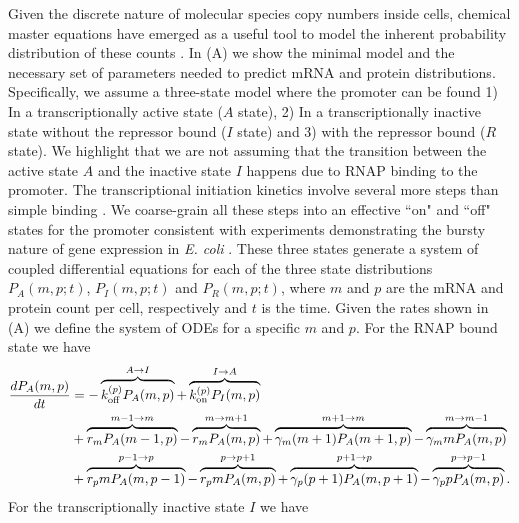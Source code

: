 Given the discrete nature of molecular species copy numbers inside cells,
chemical master equations have emerged as a useful tool to model the inherent
probability distribution of these counts \cite{Sanchez2013}. In
(A) we show the minimal model and the necessary set of
parameters needed to predict mRNA and protein distributions. Specifically, we
assume a three-state model where the promoter can be found 1) In a
transcriptionally active state  ($A$ state), 2) In a transcriptionally inactive
state without the repressor bound ($I$ state) and 3) with the repressor bound
($R$ state). We highlight that we are not assuming that the transition between
the active state $A$ and the inactive state $I$ happens due to RNAP binding to
the promoter. The transcriptional initiation kinetics involve several more steps
than simple binding \cite{Browning2004}. We coarse-grain all these steps into an
effective ``on" and ``off" states for the promoter consistent with  experiments
demonstrating the bursty nature of gene expression in {\it E. coli}
\cite{Golding2005}. These three states generate a system of coupled differential
equations for each of the three state distributions $P_A(m, p; t)$, $P_I(m, p;
t)$ and $P_R(m, p; t)$, where $m$ and $p$ are the mRNA and protein count per
cell, respectively and $t$ is the time. Given the rates shown in
(A) we define the system of ODEs for a specific $m$ and
$p$. For the RNAP bound state we have
\begin{equation}
  \begin{aligned}
    \dt{P_A(m, p)} &=
    - \overbrace{\kpoff P_A(m, p)}^{A \rightarrow I} %
    + \overbrace{\kpon P_I(m, p)}^{I \rightarrow A}\\ %
    &+ \overbrace{r_m P_A(m-1, p)}^{m-1 \rightarrow m} %
    - \overbrace{r_m P_A(m, p)}^{m \rightarrow m+1}%
    + \overbrace{\gm (m + 1) P_A(m+1 , p)}^{m+1 \rightarrow m} %
    - \overbrace{\gm m P_A(m , p)}^{m \rightarrow m-1}\\ %
    &+ \overbrace{r_p m P_A(m, p - 1)}^{p-1 \rightarrow p} %
    - \overbrace{r_p m P_A(m, p)}^{p \rightarrow p+1} %
    + \overbrace{\gp (p + 1) P_A(m, p + 1)}^{p + 1 \rightarrow p} %
    - \overbrace{\gp p P_A(m, p)}^{p \rightarrow p-1}. %
  \end{aligned}
\end{equation}
For the transcriptionally inactive state $I$ we have
